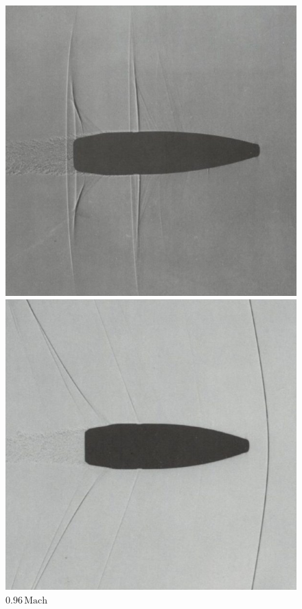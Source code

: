 \begin{figure}
    \centering
    \begin{minipage}[b]{0.32\textwidth}
        \centering
        \includegraphics[width=\linewidth]{papers/ueberschall/figures/0.96_mach_projektil.jpg}
        \caption*{$0.96\,\mathrm{Mach}$}
    \end{minipage}
    \hfill
    \begin{minipage}[b]{0.32\textwidth}
        \centering
        \includegraphics[width=\linewidth]{papers/ueberschall/figures/1.06_mach_projektil.jpg}

\end{minipage}
\end{figure}
